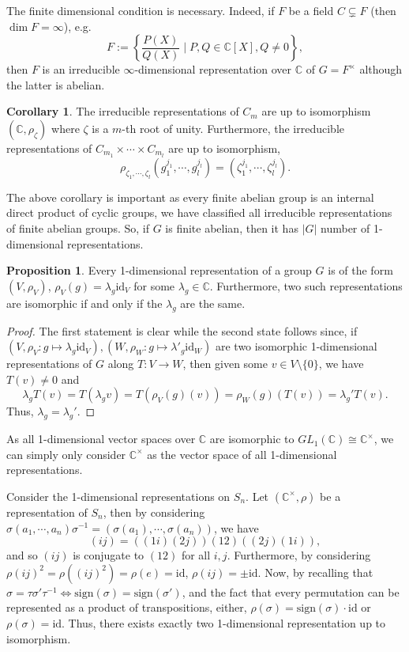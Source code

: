 \documentclass[]{article}
\theoremstyle{definition}
\newtheorem{corollary}{Corollary}[theorem]
\theoremstyle{definition}
\newtheorem{proposition}{Proposition}[section]
\begin{document}
The finite dimensional condition is necessary. Indeed, if \(F\) be a field 
\(C \subsetneq F\) (then \(\dim F = \infty\)), e.g. 
\[F := \left\{\frac{P(X)}{Q(X)} \mid P, Q \in \mathbb{C}[X], Q \neq 0 \right\},\]
then \(F\) is an irreducible \(\infty\)-dimensional representation over \(\mathbb{C}\)
of \(G = F^\times\) although the latter is abelian. 

\begin{corollary}
  The irreducible representations of \(C_m\) are up to isomorphism  
  \((\mathbb{C}, \rho_\zeta)\) where \(\zeta\) is a \(m\)-th root of unity.
  Furthermore, the irreducible representations of \(C_{m_1} \times \cdots \times 
  C_{m_l}\) are up to isomorphism,
  \[\rho_{\zeta_1, \cdots, \zeta_l}(g_1^{j_1}, \cdots, g_l^{j_l}) = 
    (\zeta_1^{j_1}, \cdots, \zeta_l^{j_l}).\]
\end{corollary}

The above corollary is important as every finite abelian group is an internal 
direct product of cyclic groups, we have classified all irreducible representations 
of finite abelian groups. So, if \(G\) is finite abelian, then it has 
\(|G|\) number of 1-dimensional representations.

\begin{proposition}
  Every 1-dimensional representation of a group \(G\) is of the form 
  \((V, \rho_V)\), \(\rho_V(g) = \lambda_g \text{id}_V\) for some 
  \(\lambda_g \in \mathbb{C}\). Furthermore, two such representations are isomorphic 
  if and only if the \(\lambda_g\) are the same.
\end{proposition}
\begin{proof}
  The first statement is clear while the second state follows since, if 
  \((V, \rho_V : g \mapsto \lambda_g \text{id}_V), 
    (W, \rho_W : g \mapsto \lambda'_g \text{id}_W)\) are two isomorphic 
  1-dimensional representations of \(G\) along \(T : V \to W\), then given some 
  \(v \in V \setminus \{0\}\), we have \(T(v) \neq 0\) and
  \[\lambda_g T(v) = T(\lambda_g v) = T(\rho_V(g)(v)) = \rho_W(g)(T(v)) = 
    \lambda_g' T(v).\]
  Thus, \(\lambda_g = \lambda_g'\).
\end{proof}

As all 1-dimensional vector spaces over \(\mathbb{C}\) are isomorphic to 
\(GL_1(\mathbb{C}) \cong \mathbb{C}^\times\), we can simply only consider 
\(\mathbb{C}^\times\) as the vector space of all 1-dimensional representations.

Consider the 1-dimensional representations on \(S_n\). Let \((\mathbb{C}^\times, \rho)\)
be a representation of \(S_n\), then by considering 
\(\sigma(a_1, \cdots, a_n)\sigma^{-1} = (\sigma(a_1), \cdots, \sigma(a_n))\), we 
have 
\[(ij) = ((1i)(2j))(12)((2j)(1i)),\]
and so \((ij)\) is conjugate to \((12)\) for all \(i, j\). Furthermore, by considering 
\(\rho(ij)^2 = \rho((ij)^2) = \rho(e) = \text{id}\), \(\rho(ij) = \pm \text{id}\).
Now, by recalling that 
\(\sigma = \tau \sigma' \tau^{-1} \iff \text{sign}(\sigma) = \text{sign}(\sigma')\), 
and the fact that every permutation can be represented as a product of transpositions, 
either, \(\rho(\sigma) = \text{sign}(\sigma) \cdot \text{id}\) or 
\(\rho(\sigma) = \text{id}\). Thus, there exists exactly two 1-dimensional 
representation up to isomorphism.
\end{document}
